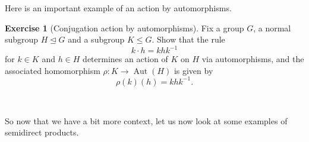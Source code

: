 \documentclass[12pt]{report}
\numberwithin{equation}{section}
\numberwithin{theorem}{chapter}
\theoremstyle{definition}
\newtheorem{exercise}{Exercise}
\newtheorem*{basic properties}{Basic Properties}
\newtheorem*{Important Remark}{Important Remark}
\newtheorem{remark}[theorem]{Remark}
\DeclareMathOperator{\Aut}{Aut}
\def\norm{\mathrel{\unlhd}}
\begin{document}
%


Here is an important example of an action by automorphisms.


\begin{exercise}[Conjugation action by automorphisms]
Fix a group $G$, a normal subgroup $H \norm G$ and a subgroup $K \leq G$. Show that the rule
$$k \cdot h = khk^{-1}$$ 
for $k \in K$ and $h \in H$ determines an action of $K$ on $H$ via automorphisms, and the associated homomorphism $\rho\!: K \to \Aut(H)$ is given by 
$$\rho(k)(h) = khk^{-1}.$$ 	
\end{exercise}

\


So now that we have a bit more context, let us now look at some examples of semidirect products.
\end{document}
